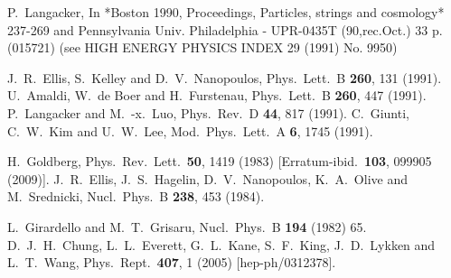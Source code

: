 \documentclass[final,3p,11pt,pdflatex]{elsarticle}
\begin{document}
\begin{thebibliography}{100}
  P.~Langacker,
  In *Boston 1990, Proceedings, Particles, strings and cosmology* 237-269 and Pennsylvania Univ. Philadelphia - UPR-0435T (90,rec.Oct.) 33 p. (015721) (see HIGH ENERGY PHYSICS INDEX 29 (1991) No. 9950)

  J.~R.~Ellis, S.~Kelley and D.~V.~Nanopoulos,
  Phys.\ Lett.\ B {\bf 260}, 131 (1991).
  U.~Amaldi, W.~de Boer and H.~Furstenau,
  Phys.\ Lett.\ B {\bf 260}, 447 (1991).
  P.~Langacker and M.~-x.~Luo,
  Phys.\ Rev.\ D {\bf 44}, 817 (1991).
  C.~Giunti, C.~W.~Kim and U.~W.~Lee,
  Mod.\ Phys.\ Lett.\ A {\bf 6}, 1745 (1991).


  H.~Goldberg,
  Phys.\ Rev.\ Lett.\  {\bf 50}, 1419 (1983)
  [Erratum-ibid.\  {\bf 103}, 099905 (2009)].
  J.~R.~Ellis, J.~S.~Hagelin, D.~V.~Nanopoulos, K.~A.~Olive and M.~Srednicki,
  Nucl.\ Phys.\ B {\bf 238}, 453 (1984).

  L.~Girardello and M.~T.~Grisaru,
  Nucl.\ Phys.\ B {\bf 194} (1982) 65.
 D.~J.~H.~Chung, L.~L.~Everett, G.~L.~Kane,
  S.~F.~King, J.~D.~Lykken and L.~T.~Wang,
  Phys.\ Rept.\  {\bf 407}, 1 (2005)
  [hep-ph/0312378].


\end{thebibliography}
\end{document}
